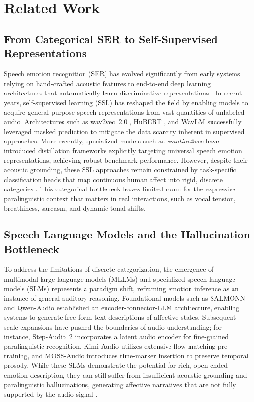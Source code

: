 \section{Related Work}

\subsection{From Categorical SER to Self-Supervised Representations}

Speech emotion recognition (SER) has evolved significantly from early systems relying on hand-crafted acoustic features \cite{elayadi2011survey, ververidis2006emotional} to end-to-end deep learning architectures that automatically learn discriminative representations \cite{trigeorgis2016adieu}. In recent years, self-supervised learning (SSL) has reshaped the field by enabling models to acquire general-purpose speech representations from vast quantities of unlabeled audio. Architectures such as wav2vec~2.0 \cite{Wav2vec2}, HuBERT \cite{HuBERT}, and WavLM \cite{WavLM} successfully leveraged masked prediction to mitigate the data scarcity inherent in supervised approaches. More recently, specialized models such as \textit{emotion2vec} \cite{emotion2vec} have introduced distillation frameworks explicitly targeting universal speech emotion representations, achieving robust benchmark performance. However, despite their acoustic grounding, these SSL approaches remain constrained by task-specific classification heads that map continuous human affect into rigid, discrete categories \cite{SUPERB}. This categorical bottleneck leaves limited room for the expressive paralinguistic context that matters in real interactions, such as vocal tension, breathiness, sarcasm, and dynamic tonal shifts.

\subsection{Speech Language Models and the Hallucination Bottleneck}

To address the limitations of discrete categorization, the emergence of multimodal large language models (MLLMs) and specialized speech language models (SLMs) represents a paradigm shift, reframing emotion inference as an instance of general auditory reasoning. Foundational models such as SALMONN \cite{SALMONN} and Qwen-Audio \cite{Qwen-Audio} established an encoder-connector-LLM architecture, enabling systems to generate free-form text descriptions of affective states. Subsequent scale expansions have pushed the boundaries of audio understanding; for instance, Step-Audio~2 \cite{Step-Audio2} incorporates a latent audio encoder for fine-grained paralinguistic recognition, Kimi-Audio \cite{Kimi-Audio} utilizes extensive flow-matching pre-training, and MOSS-Audio \cite{MOSS-Audio} introduces time-marker insertion to preserve temporal prosody. While these SLMs demonstrate the potential for rich, open-ended emotion description, they can still suffer from insufficient acoustic grounding and paralinguistic hallucinations, generating affective narratives that are not fully supported by the audio signal \cite{Qwen2-Audio}.

